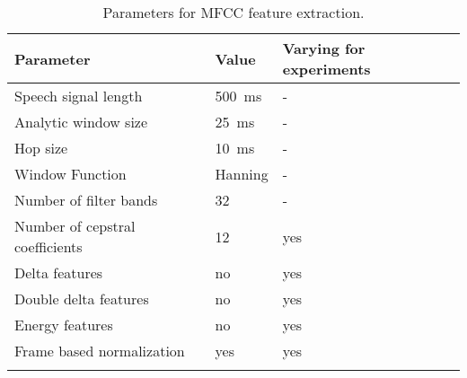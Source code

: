 \begin{table}[ht!]
\begin{center}
\caption{Parameters for MFCC feature extraction.}
\begin{tabular}{ M{6cm}  M{2cm} M{2cm}}
\toprule
\textbf{Parameter} & \textbf{Value} & \textbf{Varying for experiments} \\
\midrule
Speech signal length & \SI{500}{\milli\second} & - \\
Analytic window size & \SI{25}{\milli\second} & -\\
Hop size & \SI{10}{\milli\second} & -\\
Window Function & Hanning & -\\
\midrule
Number of filter bands & 32 & -\\
Number of cepstral coefficients & 12 & yes\\
Delta features & no & yes \\
Double delta features & no & yes \\
Energy features & no 	& yes \\
Frame based normalization & yes & yes\\
\bottomrule
\label{tab:exp_details_params_feature}
\end{tabular}
\end{center}
\vspace{-4mm}
\end{table}
\FloatBarrier
\noindent